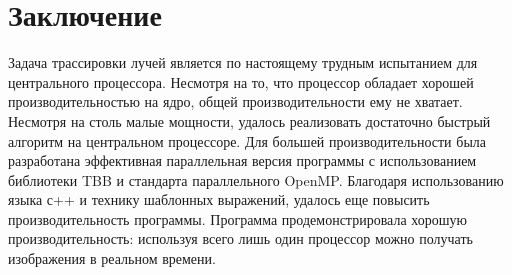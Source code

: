\documentclass[12pt, a4paper]{article}
\begin{document}
\section*{Заключение}
Задача трассировки лучей является по настоящему трудным испытанием для центрального процессора. Несмотря на то, что процессор обладает хорошей производительностью на ядро, общей производительности ему не хватает. Несмотря на столь малые мощности, удалось реализовать достаточно быстрый алгоритм на центральном процессоре. Для большей производительности была разработана эффективная параллельная версия программы с использованием библиотеки TBB и
стандарта параллельного OpenMP. Благодаря использованию языка с++ и технику шаблонных выражений, удалось еще повысить производительность программы. Программа продемонстрировала хорошую производительность: используя всего лишь один процессор можно получать изображения в реальном времени.

\end{document}
